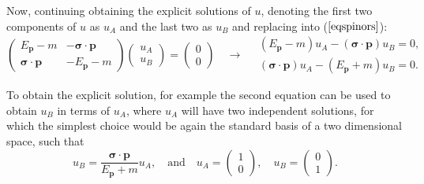Now, continuing obtaining the explicit solutions of $u$, denoting the first two components of $u$ as $u_A$ and the last two as $u_B$
and replacing into ($\ref{eqspinors}$):
\begin{equation*}
\left( \begin{array}{ccc}
E_{\bm{p}} - m & -\bm{\sigma}\cdot\bm{p} \\
\bm{\sigma}\cdot\bm{p} & -E_{\bm{p}} - m\end{array} \right)
\left( \begin{array}{c}
u_A \\
u_B \end{array} \right) = 
\left( \begin{array}{c}
0 \\
0 \end{array} \right) \quad \rightarrow \quad
\begin{array}{c}
(E_{\bm{p}} - m)u_A - (\bm{\sigma}\cdot\bm{p})u_B = 0, \\
(\bm{\sigma}\cdot\bm{p})u_A - (E_{\bm{p}} + m)u_B = 0. \end{array}
\end{equation*}

To obtain the explicit solution, for example the second equation can be used to obtain $u_B$ in terms of $u_A$, where $u_A$ will have two independent solutions, for which the simplest choice would be again the standard basis of a two dimensional space, such that
\begin{equation*}
    u_B = \dfrac{\bm{\sigma}\cdot\bm{p}}{E_{\bm{p}} + m}u_A, \quad \textrm{and} \quad u_A = \left( \begin{array}{c}
1 \\
0\end{array} \right), \quad u_B = \left( \begin{array}{c}
0 \\
1\end{array} \right).
\end{equation*}

